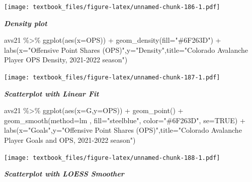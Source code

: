 \documentclass[
  11pt,
]{book}
\newenvironment{Shaded}{\begin{snugshade}}{\end{snugshade}}
\newcommand{\AttributeTok}[1]{\textcolor[rgb]{0.77,0.63,0.00}{#1}}
\newcommand{\ConstantTok}[1]{\textcolor[rgb]{0.00,0.00,0.00}{#1}}
\newcommand{\FunctionTok}[1]{\textcolor[rgb]{0.00,0.00,0.00}{#1}}
\newcommand{\NormalTok}[1]{#1}
\newcommand{\SpecialCharTok}[1]{\textcolor[rgb]{0.00,0.00,0.00}{#1}}
\newcommand{\StringTok}[1]{\textcolor[rgb]{0.31,0.60,0.02}{#1}}
\theoremstyle{definition}
\theoremstyle{definition}
\theoremstyle{definition}
\theoremstyle{definition}
\theoremstyle{remark}
\begin{document}
\texttt{[image: textbook\_files/figure-latex/unnamed-chunk-186-1.pdf]}

\newpage

\textbf{\emph{Density plot}}

\begin{Shaded}
\begin{Highlighting}[]
\NormalTok{avs21 }\SpecialCharTok{\%\textgreater{}\%} \FunctionTok{ggplot}\NormalTok{(}\FunctionTok{aes}\NormalTok{(}\AttributeTok{x=}\NormalTok{OPS)) }\SpecialCharTok{+} \FunctionTok{geom\_density}\NormalTok{(}\AttributeTok{fill=}\StringTok{"\#6F263D"}\NormalTok{) }\SpecialCharTok{+} 
  \FunctionTok{labs}\NormalTok{(}\AttributeTok{x=}\StringTok{"Offensive Point Shares (OPS)"}\NormalTok{,}\AttributeTok{y=}\StringTok{"Density"}\NormalTok{,}\AttributeTok{title=}\StringTok{"Colorado Avalanche Player OPS Density, 2021{-}2022 season"}\NormalTok{)}
\end{Highlighting}
\end{Shaded}

\texttt{[image: textbook\_files/figure-latex/unnamed-chunk-187-1.pdf]}

\newpage

\textbf{\emph{Scatterplot with Linear Fit}}

\begin{Shaded}
\begin{Highlighting}[]
\NormalTok{avs21 }\SpecialCharTok{\%\textgreater{}\%} \FunctionTok{ggplot}\NormalTok{(}\FunctionTok{aes}\NormalTok{(}\AttributeTok{x=}\NormalTok{G,}\AttributeTok{y=}\NormalTok{OPS)) }\SpecialCharTok{+} \FunctionTok{geom\_point}\NormalTok{() }\SpecialCharTok{+}
  \FunctionTok{geom\_smooth}\NormalTok{(}\AttributeTok{method=}\NormalTok{lm , }\AttributeTok{fill=}\StringTok{"steelblue"}\NormalTok{, }\AttributeTok{color=}\StringTok{"\#6F263D"}\NormalTok{, }\AttributeTok{se=}\ConstantTok{TRUE}\NormalTok{) }\SpecialCharTok{+}
  \FunctionTok{labs}\NormalTok{(}\AttributeTok{x=}\StringTok{"Goals"}\NormalTok{,}\AttributeTok{y=}\StringTok{"Offensive Point Shares (OPS)"}\NormalTok{,}\AttributeTok{title=}\StringTok{"Colorado Avalanche Player Goals and OPS, 2021{-}2022 season"}\NormalTok{)}
\end{Highlighting}
\end{Shaded}

\texttt{[image: textbook\_files/figure-latex/unnamed-chunk-188-1.pdf]}

\newpage

\textbf{\emph{Scatterplot with LOESS Smoother}}
\end{document}
